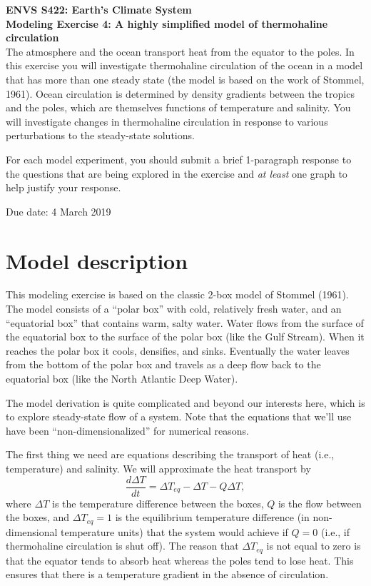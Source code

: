 \documentclass[11pt,letterpaper]{article}
\begin{document}
\setlength{\parindent}{0in}
\newcommand{\tablespace}[0]{\vspace{8pt}}
\textbf{ENVS S422: Earth's Climate System\\
Modeling Exercise 4: A highly simplified model of thermohaline circulation}\\%

The atmosphere and the ocean transport heat from the equator to the poles. In this exercise you will investigate thermohaline circulation of the ocean in a model that has more than one steady state (the model is based on the work of Stommel, 1961). Ocean circulation is determined by density gradients between the tropics and the poles, which are themselves functions of temperature and salinity. You will investigate changes in thermohaline circulation in response to various perturbations to the steady-state solutions.

For each model experiment, you should submit a brief 1-paragraph response to the questions that are being explored in the exercise and \textit{at least} one graph to help justify your response.

Due date: 4 March 2019

\section{Model description}
This modeling exercise is based on the classic 2-box model of Stommel (1961). The model consists of a ``polar box'' with cold, relatively fresh water, and an ``equatorial box'' that contains warm, salty water. Water flows from the surface of the equatorial box to the surface of the polar box (like the Gulf Stream). When it reaches the polar box it cools, densifies, and sinks. Eventually the water leaves from the bottom of the polar box and travels as a deep flow back to the equatorial box (like the North Atlantic Deep Water).



The model derivation is quite complicated and beyond our interests here, which is to explore steady-state flow of a system. Note that the equations that we'll use have been ``non-dimensionalized'' for numerical reasons. 

The first thing we need are equations describing the transport of heat (i.e., temperature) and salinity. We will approximate the heat transport by
\begin{equation}
\frac{d\Delta{T}}{dt}=\Delta{T_{eq}}-\Delta{T}-Q\Delta{T},
\label{eq:deltaT}
\end{equation}
where $\Delta{T}$ is the temperature difference between the boxes, $Q$ is the flow between the boxes, and $\Delta{T_{eq}}=1$ is the equilibrium temperature difference (in non-dimensional temperature units) that the system would achieve if $Q=0$ (i.e., if thermohaline circulation is shut off). The reason that $\Delta{T_{eq}}$ is not equal to zero is that the equator tends to absorb heat whereas the poles tend to lose heat. This ensures that there is a temperature gradient in the absence of circulation.
\end{document}
